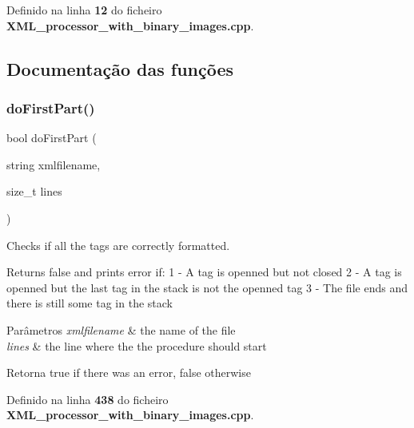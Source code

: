Definido na linha \textbf{ 12} do ficheiro \textbf{ X\+M\+L\+\_\+processor\+\_\+with\+\_\+binary\+\_\+images.\+cpp}.



\subsection{Documentação das funções}
\mbox{\label{_x_m_l__processor__with__binary__images_8cpp_a96686cdbe38df0bb13e417f97a93fbca}} 
\subsubsection{do\+First\+Part()}
{\footnotesize\ttfamily bool do\+First\+Part (\begin{DoxyParamCaption}\item[{string}]{xmlfilename,  }\item[{size\+\_\+t}]{lines }\end{DoxyParamCaption})}



Checks if all the tags are correctly formatted. 

Returns false and prints error if\+: 1 -\/ A tag is openned but not closed 2 -\/ A tag is openned but the last tag in the stack is not the openned tag 3 -\/ The file ends and there is still some tag in the stack 
\begin{DoxyParams}{Parâmetros}
{\em xmlfilename} & the name of the file \\
\hline
{\em lines} & the line where the the procedure should start \\
\hline
\end{DoxyParams}
\begin{DoxyReturn}{Retorna}
true if there was an error, false otherwise 
\end{DoxyReturn}


Definido na linha \textbf{ 438} do ficheiro \textbf{ X\+M\+L\+\_\+processor\+\_\+with\+\_\+binary\+\_\+images.\+cpp}.

\mbox{\label{_x_m_l__processor__with__binary__images_8cpp_a46eccdc4bac32fc893146702272c2a0f}} 
